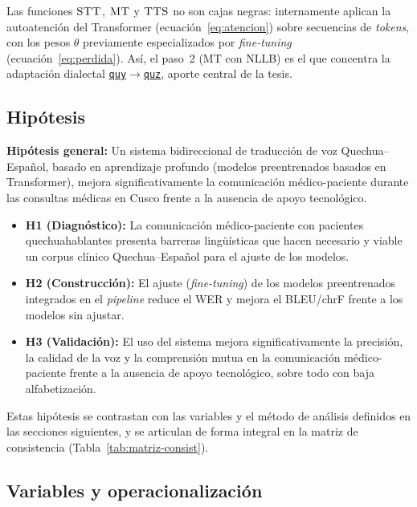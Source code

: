 \documentclass[12pt,a4paper]{article}
\newenvironment{bloqueNuevo}{\par}{\par}
\newcommand{\obsdos}[1]{\textcolor{verdeOK}{#1}}
\newenvironment{bloqueObsDos}{\par\color{verdeOK}}{\par}
\DeclareRobustCommand{\sig}[1]{\hyperlink{sig:#1}{\texttt{#1}}}
\begin{document}
\begin{bloqueNuevo}
\noindent Las funciones $\textsc{STT}$, $\textsc{MT}$ y $\textsc{TTS}$ no son cajas negras: internamente
aplican la autoatenci{\'o}n del Transformer (ecuaci{\'o}n~\ref{eq:atencion}) sobre secuencias de
\emph{tokens}, con los pesos $\theta$ previamente especializados por \emph{fine-tuning}
(ecuaci{\'o}n~\ref{eq:perdida}). As{\'i}, el paso~2 (MT con NLLB) es el que concentra la
adaptaci{\'o}n dialectal \sig{quy}$\to$\sig{quz}, aporte central de la tesis.
\end{bloqueNuevo}

\subsection{\obsdos{Hip{\'o}tesis}}
\begin{bloqueObsDos}
\noindent\textbf{Hip{\'o}tesis general:} Un sistema bidireccional de traducci{\'o}n de voz
Quechua--Espa{\~n}ol, basado en aprendizaje profundo (modelos preentrenados basados en
Transformer), mejora significativamente la comunicaci{\'o}n m{\'e}dico-paciente durante las consultas
m{\'e}dicas en Cusco frente a la ausencia de apoyo tecnol{\'o}gico.
\begin{itemize}
  \item \textbf{H1 (Diagn{\'o}stico):} La comunicaci{\'o}n m{\'e}dico-paciente con pacientes quechuahablantes presenta barreras ling{\"u}{\'i}sticas que hacen necesario y viable un corpus cl{\'i}nico Quechua--Espa{\~n}ol para el ajuste de los modelos.
  \item \textbf{H2 (Construcci{\'o}n):} El ajuste (\emph{fine-tuning}) de los modelos preentrenados integrados en el \emph{pipeline} reduce el WER y mejora el BLEU/chrF frente a los modelos sin ajustar.
  \item \textbf{H3 (Validaci{\'o}n):} El uso del sistema mejora significativamente la precisi{\'o}n, la calidad de la voz y la comprensi{\'o}n mutua en la comunicaci{\'o}n m{\'e}dico-paciente frente a la ausencia de apoyo tecnol{\'o}gico, sobre todo con baja alfabetizaci{\'o}n.
\end{itemize}
\noindent Estas hip{\'o}tesis se contrastan con las variables y el m{\'e}todo de an{\'a}lisis
definidos en las secciones siguientes, y se articulan de forma integral en la matriz de
consistencia (Tabla~\ref{tab:matriz-consist}).
\end{bloqueObsDos}

\subsection{Variables y operacionalizaci{\'o}n}
\end{document}

